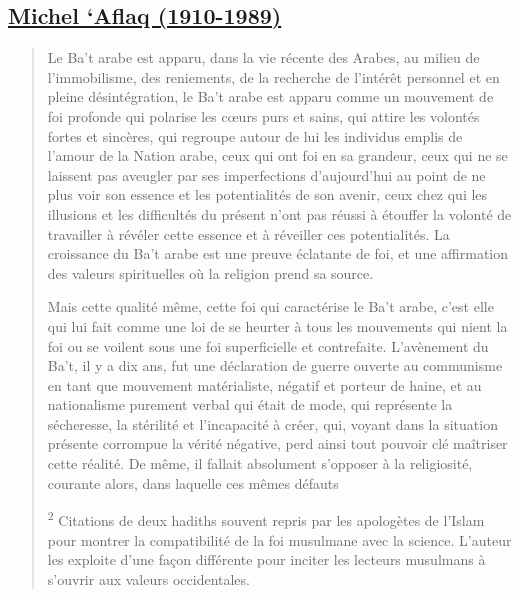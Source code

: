 \hypertarget{michel-aflaq-1910-1989}{%
\subsection{\texorpdfstring{\underline{Michel `Aflaq
(1910-1989)}}{Michel `Aflaq (1910-1989)}}\label{michel-aflaq-1910-1989}}

\begin{quote}
Le Ba't arabe est apparu, dans la vie récente des Arabes, au milieu de
l'immobilisme, des reniements, de la recherche de l'intérêt personnel et
en pleine désintégration, le Ba't arabe est apparu comme un mouvement de
foi profonde qui polarise les cœurs purs et sains, qui attire les
volontés fortes et sincères, qui regroupe autour de lui les individus
emplis de l'amour de la Nation arabe, ceux qui ont foi en sa grandeur,
ceux qui ne se laissent pas aveugler par ses imperfections d'aujourd'hui
au point de ne plus voir son essence et les potentialités de son avenir,
ceux chez qui les illusions et les difficultés du présent n'ont pas
réussi à étouffer la volonté de travailler à révéler cette essence et à
réveiller ces potentialités. La croissance du Ba't arabe est une preuve
éclatante de foi, et une affirmation des valeurs spirituelles où la
religion prend sa source.

Mais cette qualité même, cette foi qui caractérise le Ba't arabe, c'est
elle qui lui fait comme une loi de se heurter à tous les mouvements qui
nient la foi ou se voilent sous une foi superficielle et contrefaite.
L'avènement du Ba't, il y a dix ans, fut une déclaration de guerre
ouverte au communisme en tant que mouvement matérialiste, négatif et
porteur de haine, et au nationalisme purement verbal qui était de mode,
qui représente la sécheresse, la stérilité et l'incapacité à créer, qui,
voyant dans la situation présente corrompue la vérité négative, perd
ainsi tout pouvoir clé maîtriser cette réalité. De même, il fallait
absolument s'opposer à la religiosité, courante alors, dans laquelle ces
mêmes défauts

\textsuperscript{2} Citations de deux hadiths souvent repris par les
apologètes de l'Islam pour montrer la compatibilité de la foi musulmane
avec la science. L'auteur les exploite d'une façon différente pour
inciter les lecteurs musulmans à s'ouvrir aux valeurs occidentales.


\end{quote}
